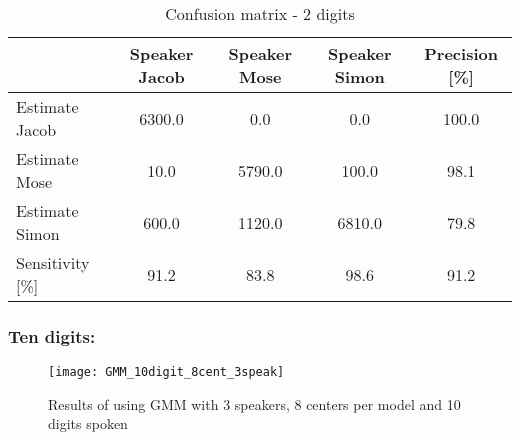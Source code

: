 \begin{table}[H]                                              
\centering                                                     
\begin{tabular}{|l|c|c|c|c|}                                   
\hline                                                         
  & Speaker Jacob & Speaker Mose & Speaker Simon & Precision [\%] \\
\hline                                                         
Estimate Jacob & 6300.0 & 0.0 & 0.0 & 100.0 \\                 
\hline                                                         
Estimate Mose & 10.0 & 5790.0 & 100.0 & 98.1 \\                
\hline                                                         
Estimate Simon & 600.0 & 1120.0 & 6810.0 & 79.8 \\             
\hline                                                         
Sensitivity [\%] & 91.2 & 83.8 & 98.6 & 91.2 \\                
\hline                                                         
\end{tabular}                                                  
\caption{Confusion matrix - 2 digits}                          
\label{table:GMM_conf_2}                                       
\end{table} 
\subsubsection{Ten digits:}

\begin{figure}[H]
\centering
\texttt{[image: GMM\_10digit\_8cent\_3speak]}
\caption{Results of using GMM with 3 speakers, 8 centers per model and 10 digits spoken}
\label{fig:GMM_fig_10}
\end{figure}

